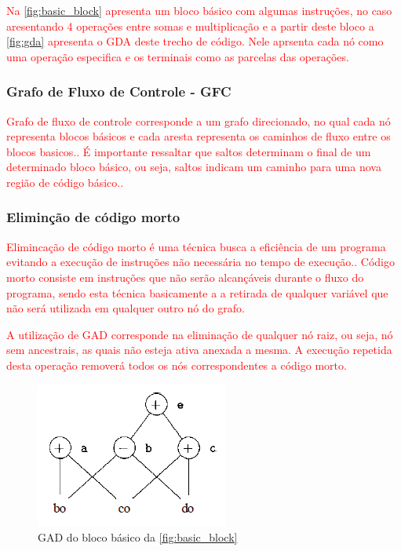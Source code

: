 \textcolor{red}{Na \autoref{fig:basic_block} apresenta um bloco básico com algumas instruções, no caso aresentando 4 operações entre somas e multiplicação e a partir deste bloco a \autoref{fig:gda} apresenta o GDA deste trecho de código. Nele aprsenta cada nó como uma operação especifica e os terminais como as parcelas das operações.}

\subsubsection{Grafo de Fluxo de Controle - GFC}
\par
\textcolor{red}{Grafo de fluxo de controle corresponde a um grafo direcionado, no qual cada nó representa blocos básicos e cada aresta representa os caminhos de fluxo entre os blocos basicos.\cite{allen1970control}. É importante ressaltar que saltos determinam o final de um determinado bloco básico, ou seja, saltos indicam um caminho para uma nova região de código básico.\cite{aho2007compilers}.}


\subsubsection{Eliminção de código morto}
\par
\textcolor{red}{Elimincação de código morto é uma técnica busca a eficiência de um programa evitando a execução de instruções não necessária no tempo de execução.\cite{knoop1994partial}. Código morto consiste em instruções que não serão alcançáveis durante o fluxo do programa, sendo esta técnica basicamente a a retirada de qualquer variável que não será utilizada em qualquer outro nó do grafo\cite{aho2007compilers}.}

\par
\textcolor{red}{A utilização de GAD corresponde na eliminação de qualquer nó raiz, ou seja, nó sem ancestrais, as quais não esteja ativa anexada a mesma. A execução repetida desta operação removerá todos os nós correspondentes a código morto\cite{aho2007compilers}.}

\begin{figure}[htb]
	\begin{center}
    \caption{\label{fig:elimicacao_codigo}GAD do bloco básico da \autoref{fig:basic_block}}
	\includegraphics[scale=0.70]{Figuras/eliminacao_codigo.png}
	\end{center}
\end{figure}

